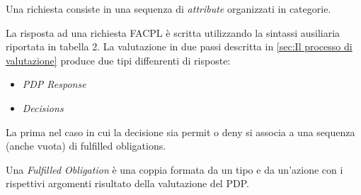 Una richiesta consiste in una sequenza di \emph{attribute} organizzati in categorie.\par
La risposta ad una richiesta FACPL è scritta utilizzando la sintassi ausiliaria riportata in tabella 2. La valutazione
in due passi descritta in \ref{sec:Il processo di valutazione} produce due tipi diffenrenti di risposte:
\begin{itemize}
  \item \emph{PDP Response}
  \item \emph{Decisions}
\end{itemize}
La prima nel caso in cui la decisione sia permit o deny si associa a una sequenza (anche vuota) di fulfilled obligations.\par
Una \emph{Fulfilled Obligation} è una coppia formata da un tipo e da un'azione con i rispettivi argomenti risultato della
valutazione del PDP.


